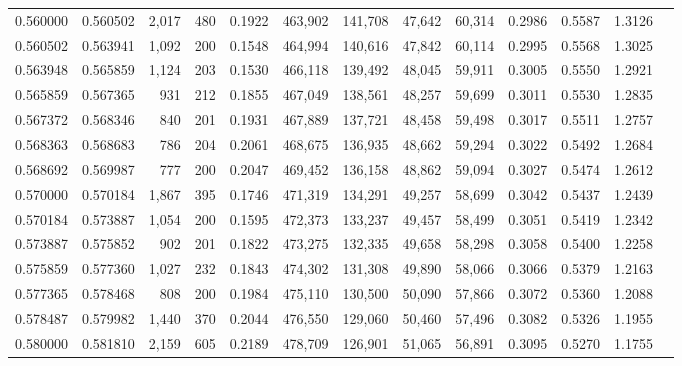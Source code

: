 \begin{tabular}{rrrrrrrrrrrrr}
0.560000 & 0.560502 & 2,017 & 480 &                                     0.1922 & 463,902 & 141,708 &  47,642 &  60,314 & 0.2986 & 0.5587 & 1.3126 \\
0.560502 & 0.563941 & 1,092 & 200 &                                     0.1548 & 464,994 & 140,616 &  47,842 &  60,114 & 0.2995 & 0.5568 & 1.3025 \\
0.563948 & 0.565859 & 1,124 & 203 &                                     0.1530 & 466,118 & 139,492 &  48,045 &  59,911 & 0.3005 & 0.5550 & 1.2921 \\
0.565859 & 0.567365 &   931 & 212 &                                     0.1855 & 467,049 & 138,561 &  48,257 &  59,699 & 0.3011 & 0.5530 & 1.2835 \\
0.567372 & 0.568346 &   840 & 201 &                                     0.1931 & 467,889 & 137,721 &  48,458 &  59,498 & 0.3017 & 0.5511 & 1.2757 \\
0.568363 & 0.568683 &   786 & 204 &                                     0.2061 & 468,675 & 136,935 &  48,662 &  59,294 & 0.3022 & 0.5492 & 1.2684 \\
0.568692 & 0.569987 &   777 & 200 &                                     0.2047 & 469,452 & 136,158 &  48,862 &  59,094 & 0.3027 & 0.5474 & 1.2612 \\
0.570000 & 0.570184 & 1,867 & 395 &                                     0.1746 & 471,319 & 134,291 &  49,257 &  58,699 & 0.3042 & 0.5437 & 1.2439 \\
0.570184 & 0.573887 & 1,054 & 200 &                                     0.1595 & 472,373 & 133,237 &  49,457 &  58,499 & 0.3051 & 0.5419 & 1.2342 \\
0.573887 & 0.575852 &   902 & 201 &                                     0.1822 & 473,275 & 132,335 &  49,658 &  58,298 & 0.3058 & 0.5400 & 1.2258 \\
0.575859 & 0.577360 & 1,027 & 232 &                                     0.1843 & 474,302 & 131,308 &  49,890 &  58,066 & 0.3066 & 0.5379 & 1.2163 \\
0.577365 & 0.578468 &   808 & 200 &                                     0.1984 & 475,110 & 130,500 &  50,090 &  57,866 & 0.3072 & 0.5360 & 1.2088 \\
0.578487 & 0.579982 & 1,440 & 370 &                                     0.2044 & 476,550 & 129,060 &  50,460 &  57,496 & 0.3082 & 0.5326 & 1.1955 \\
0.580000 & 0.581810 & 2,159 & 605 &                                     0.2189 & 478,709 & 126,901 &  51,065 &  56,891 & 0.3095 & 0.5270 & 1.1755 \\

\end{tabular}
